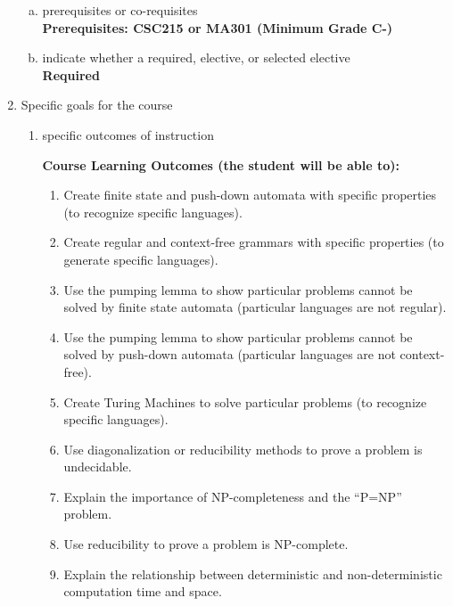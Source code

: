 \begin{enumerate}[1.]
\begin{enumerate}[a.]
\item prerequisites or co-requisites\\
  {\bfseries
    Prerequisites: CSC215 or MA301 (Minimum Grade C-)
  }

\item indicate whether a required, elective, or selected elective\\ %
  {\bfseries
    Required
  }

\end{enumerate}

\item Specific goals for the course
\begin{enumerate}
\item specific outcomes of instruction\\ %
  {\bfseries
    Course Learning Outcomes (the student will be able to):
\begin{enumerate}
\item Create finite state and push-down automata with specific properties (to recognize specific languages).
\item Create regular and context-free grammars with specific properties (to generate specific languages).
\item Use the pumping lemma to show particular problems cannot be solved by finite state automata (particular languages are not regular).
\item Use the pumping lemma to show particular problems cannot be solved by push-down automata (particular languages are not context-free).
\item Create Turing Machines to solve particular problems (to recognize specific languages).
\item Use diagonalization or reducibility methods to prove a problem is undecidable.
\item Explain the importance of NP-completeness and the ``P=NP'' problem.
\item Use reducibility to prove a problem is NP-complete.
\item Explain the relationship between deterministic and non-deterministic computation time and space.
\end{enumerate}
  }


\end{enumerate}
\end{enumerate}
